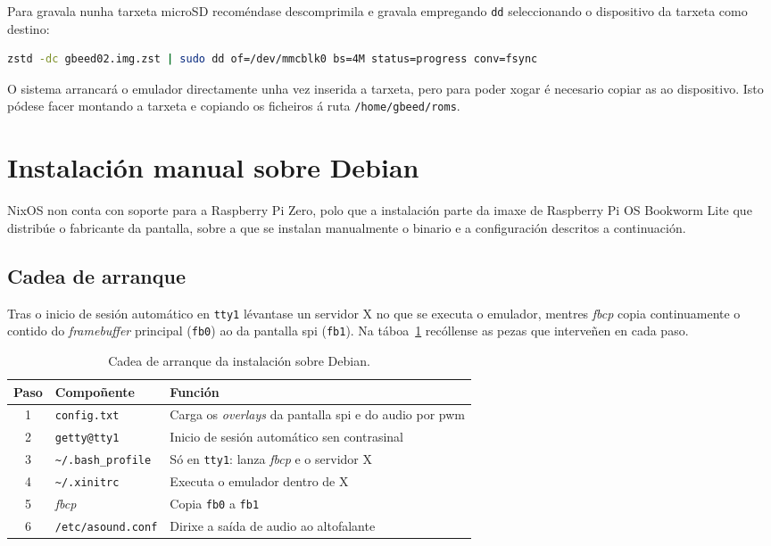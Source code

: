 Para gravala nunha tarxeta microSD recoméndase descomprimila e gravala empregando \texttt{dd}
seleccionando o dispositivo da tarxeta como destino:

\begin{lstlisting}[language=bash]
zstd -dc gbeed02.img.zst | sudo dd of=/dev/mmcblk0 bs=4M status=progress conv=fsync
\end{lstlisting}

O sistema arrancará o emulador directamente unha vez inserida a tarxeta, pero para poder xogar
é necesario copiar as  ao dispositivo. Isto pódese facer montando a tarxeta e copiando os ficheiros á ruta \texttt{/home/gbeed/roms}.



\section{Instalación manual sobre Debian}

NixOS non conta con soporte para a Raspberry Pi Zero, polo que a instalación parte da imaxe de
Raspberry Pi OS Bookworm Lite que distribúe o fabricante da pantalla, sobre a que se instalan manualmente
o binario e a configuración descritos a continuación.

\subsection{Cadea de arranque}

Tras o inicio de sesión automático en \texttt{tty1} lévantase un
servidor X no que se executa o emulador, mentres \textit{fbcp} copia continuamente o contido do
\textit{framebuffer} principal (\texttt{fb0}) ao da pantalla \acrshort{spi} (\texttt{fb1}).
Na táboa~\ref{tab:arranque-debian} recóllense as pezas que interveñen en cada paso.

\begin{table}[htbp]
  \centering
  \small
  \begin{tabular}{clp{6.2cm}}
    \hline
    \textbf{Paso} & \textbf{Compoñente} & \textbf{Función} \\
    \hline
    1 & \texttt{config.txt}      & Carga os \textit{overlays} da pantalla \acrshort{spi} e do audio por \acrshort{pwm} \\
    2 & \texttt{getty@tty1}      & Inicio de sesión automático sen contrasinal \\
    3 & \texttt{\textasciitilde/.bash\_profile} & Só en \texttt{tty1}: lanza \textit{fbcp} e o servidor X \\
    4 & \texttt{\textasciitilde/.xinitrc}       & Executa o emulador dentro de X \\
    5 & \textit{fbcp}            & Copia \texttt{fb0} a \texttt{fb1} \\
    6 & \texttt{/etc/asound.conf} & Dirixe a saída de audio ao altofalante \\
    \hline
  \end{tabular}
  \caption{Cadea de arranque da instalación sobre Debian.}
  \label{tab:arranque-debian}
\end{table}

